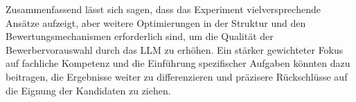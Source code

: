 Zusammenfassend lässt sich sagen, dass das Experiment vielversprechende Ansätze aufzeigt, aber weitere Optimierungen in der Struktur und den Bewertungsmechanismen erforderlich sind, um die Qualität der Bewerbervorauswahl durch das LLM zu erhöhen. Ein stärker gewichteter Fokus auf fachliche Kompetenz und die Einführung spezifischer Aufgaben könnten dazu beitragen, die Ergebnisse weiter zu differenzieren und präzisere Rückschlüsse auf die Eignung der Kandidaten zu ziehen.